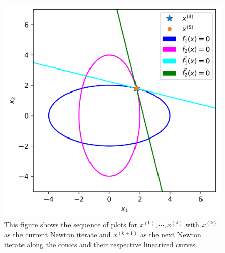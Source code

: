 \documentclass{article}
\begin{document}
\begin{enumerate}
\begin{figure}[!ht]
    \includegraphics[scale=0.5]{fig4.png}
    \caption{This figure shows the sequence of plots for $x^{(0)}, \cdots, x^{(4)}$ with $x^{(k)}$ as the current Newton iterate and $x^{(k + 1)}$ as the next Newton iterate along the conics and their respective linearized curves.}
    \end{figure}
\end{enumerate}
\end{document}
